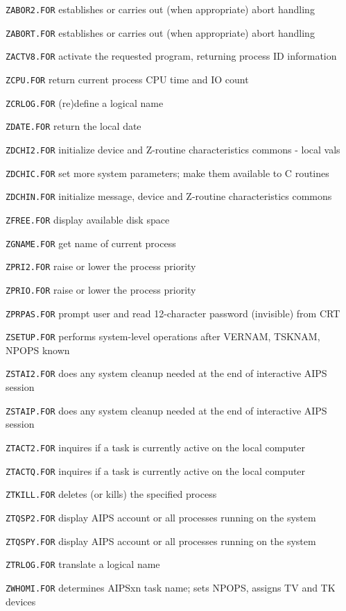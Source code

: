 {\item{\tt ZABOR2.FOR} establishes or carries out (when appropriate) abort handling
\item{\tt ZABORT.FOR} establishes or carries out (when appropriate) abort handling
\item{\tt ZACTV8.FOR} activate the requested program, returning process ID information
\item{\tt ZCPU.FOR} return current process CPU time and IO count
\item{\tt ZCRLOG.FOR} (re)define a logical name
\item{\tt ZDATE.FOR} return the local date
\item{\tt ZDCHI2.FOR} initialize device and Z-routine characteristics commons - local vals
\item{\tt ZDCHIC.FOR} set more system parameters; make them available to C routines
\item{\tt ZDCHIN.FOR} initialize message, device and Z-routine characteristics commons
\item{\tt ZFREE.FOR} display available disk space
\item{\tt ZGNAME.FOR} get name of current process
\item{\tt ZPRI2.FOR} raise or lower the process priority
\item{\tt ZPRIO.FOR} raise or lower the process priority
\item{\tt ZPRPAS.FOR} prompt user and read 12-character password (invisible) from CRT
\item{\tt ZSETUP.FOR} performs system-level operations after VERNAM, TSKNAM, NPOPS known
\item{\tt ZSTAI2.FOR} does any system cleanup needed at the end of interactive AIPS session
\item{\tt ZSTAIP.FOR} does any system cleanup needed at the end of interactive AIPS session
\item{\tt ZTACT2.FOR} inquires if a task is currently active on the local computer
\item{\tt ZTACTQ.FOR} inquires if a task is currently active on the local computer
\item{\tt ZTKILL.FOR} deletes (or kills) the specified process
\item{\tt ZTQSP2.FOR} display AIPS account or all processes running on the system
\item{\tt ZTQSPY.FOR} display AIPS account or all processes running on the system
\item{\tt ZTRLOG.FOR} translate a logical name
\item{\tt ZWHOMI.FOR} determines AIPSxn task name; sets NPOPS, assigns TV and TK devices

}

